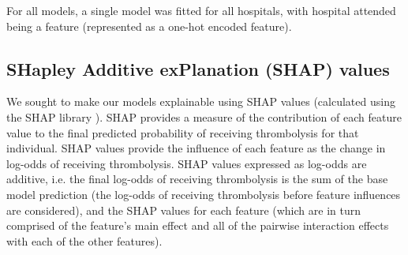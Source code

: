 For all models, a single model was fitted for all hospitals, with hospital attended being a feature (represented as a one-hot encoded feature).

\iffalse
\subsection{Characteristics of the most thrombolysable patient (at each hospital)}
We identified the patient at each hospital that the model predicted had the highest probability of receiving thrombolysis (using the combined test-set results from the \emph{k-fold model}), and compared the feature values of those 132 patients to:
\begin{itemize}
\item All patients
\item All patients who had received thrombolysis
\item All patients who had not received thrombolysis
\end{itemize}
\fi

\subsection{SHapley Additive exPlanation (SHAP) values}

We sought to make our models explainable using SHAP values (calculated using the SHAP library \cite{lundberg_unified_2017}). SHAP provides a measure of the contribution of each feature value to the final predicted probability of receiving thrombolysis for that individual. SHAP values provide the influence of each feature as the change in log-odds of receiving thrombolysis. SHAP values expressed as log-odds are additive, i.e. the final log-odds of receiving thrombolysis is the sum of the base model prediction (the log-odds of receiving thrombolysis before feature influences are considered), and the SHAP values for each feature (which are in turn comprised of the feature's main effect and all of the pairwise interaction effects with each of the other features). 




